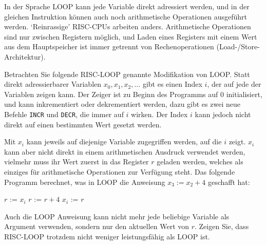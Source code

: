 In der Sprache LOOP kann jede Variable direkt adressiert werden, und
in der gleichen Instruktion können auch noch arithmetische Operationen
ausgeführt werden. `Reinrassige' RISC-CPUs arbeiten anders.
Arithmetische Operationen sind nur zwischen Registern möglich,
und Laden eines Registers mit einem Wert aus dem Hauptspeicher ist
immer getrennt von Rechenoperationen (Load-/Store-Architektur).

Betrachten Sie folgende RISC-LOOP genannte Modifikation von LOOP.
Statt direkt adressierbarer Variablen
$x_0,x_1,x_2,\dots$ gibt es einen Index $i$, der auf jede der Variablen zeigen
kann. Der Zeiger ist zu Beginn des Programms auf $0$ initialisiert, und kann
inkrementiert oder dekrementiert werden, dazu gibt
es zwei neue Befehle {\tt INCR} und {\tt DECR}, die immer auf $i$
wirken.
Der Index $i$ kann jedoch nicht direkt auf einen bestimmten Wert gesetzt werden.

Mit $x_i$
kann jeweils auf diejenige Variable zugegriffen werden, auf die $i$ zeigt.
$x_i$ kann aber nicht direkt in einem arithmetischen Ausdruck verwendet werden,
vielmehr muss ihr Wert zuerst in das Register $r$ geladen werden, welches
als einziges für arithmetische Operationen zur Verfügung steht. Das folgende
Programm berechnet, was in LOOP die Anweisung $x_3 := x_2 + 4$
geschafft hat:
\begin{algorithmic}[1]
\STATE $r$ := $x_i$
\STATE $r$ := $r + 4$
\STATE $x_i$ := $r$
\end{algorithmic}
Auch die LOOP Anweisung kann nicht mehr jede beliebige Variable als
Argument verwenden, sondern nur den aktuellen Wert von $r$.
Zeigen Sie, dass RISC-LOOP trotzdem nicht weniger leistungsfähig als
LOOP ist.


